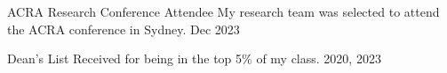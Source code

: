
\begin{cvhonors}
	\cvhonor
	{ACRA Research Conference Attendee}
	{My research team was selected to attend the ACRA conference in Sydney.}
	{}
	{Dec 2023}

	\cvhonor
	{Dean's List}
	{Received for being in the top 5\% of my class.}
	{}
	{2020, 2023}
\end{cvhonors}
